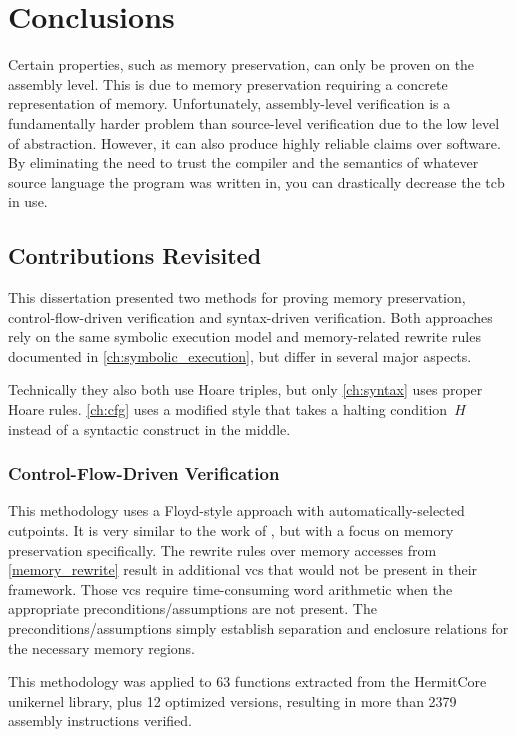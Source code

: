\chapter{Conclusions}\label{ch:conclusions}
Certain properties, such as memory preservation, can only be proven on the assembly level.
This is due to memory preservation requiring a concrete representation of memory.
Unfortunately, assembly-level verification is a fundamentally harder problem
than source-level verification due to the low level of abstraction.
However, it can also produce highly reliable claims over software.
By eliminating the need to trust the compiler
and the semantics of whatever source language the program was written in,
you can drastically decrease the \ac{tcb} in use.

\section{Contributions Revisited}
This dissertation presented two methods for proving memory preservation,
control-flow-driven verification and syntax-driven verification.
Both approaches rely on the same symbolic execution model and memory-related rewrite rules
documented in \cref{ch:symbolic_execution}, but differ in several major aspects.

Technically they also both use Hoare triples, but only \cref{ch:syntax}
uses proper Hoare rules. \cref{ch:cfg} uses a modified style
that takes a halting condition~$H$ instead of a syntactic construct in the middle.

\subsection{Control-Flow-Driven Verification}
This methodology uses a Floyd-style approach \autocite{floyd1967assigning}
with automatically-selected cutpoints.
It is very similar to the work of \textcite{matthews2006verification},
but with a focus on memory preservation specifically.
The rewrite rules over memory accesses from \cref{memory_rewrite}
result in additional \acp{vc} that would not be present in their framework.
Those \acp{vc} require time-consuming word arithmetic
when the appropriate preconditions/assumptions are not present.
The preconditions/assumptions simply establish separation and enclosure relations
for the necessary memory regions.

This methodology was applied to \num{63} functions
extracted from the HermitCore unikernel library, plus \num{12} optimized versions,
resulting in more than \num{2379} assembly instructions verified.

